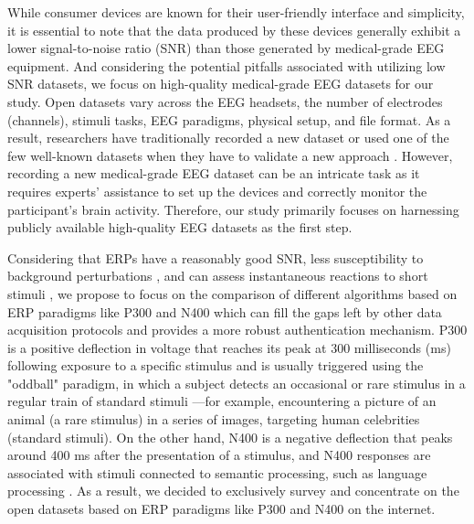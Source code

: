 While consumer devices are known for their user-friendly interface and simplicity, it is essential to note that the data produced by these devices generally exhibit a lower signal-to-noise ratio (SNR) than those generated by medical-grade EEG equipment. And considering the potential pitfalls associated with utilizing low SNR datasets, we focus on high-quality medical-grade EEG datasets for our study. Open datasets vary across the EEG headsets, the number of electrodes (channels), stimuli tasks, EEG paradigms, physical setup, and file format. As a result, researchers have traditionally recorded a new dataset or used one of the few well-known datasets when they have to validate a new approach \cite{moabb}. However, recording a new medical-grade EEG dataset can be an intricate task as it requires experts' assistance to set up the devices and correctly monitor the participant's brain activity. Therefore, our study primarily focuses on harnessing publicly available high-quality EEG datasets as the first step.
\smallskip

Considering that ERPs have a reasonably good SNR, less susceptibility to background perturbations \cite{armstrong2015brainprint}, and can assess instantaneous reactions to short stimuli \cite{zhang2021review}, we propose to focus on the comparison of different algorithms based on ERP paradigms like P300 and N400 which can fill the gaps left by other data acquisition protocols and provides a more robust authentication mechanism. P300 is a positive deflection in voltage that reaches its peak at 300 milliseconds (ms) following exposure to a specific stimulus and is usually triggered using the "oddball" paradigm, in which a subject detects an occasional or rare stimulus in a regular train of standard stimuli \cite{picton1992p300}—for example, encountering a picture of an animal (a rare stimulus) in a series of images, targeting human celebrities (standard stimuli). On the other hand, N400 is a negative deflection that peaks around 400 ms after the presentation of a stimulus, and N400 responses are associated with stimuli connected to semantic processing, such as language processing \cite{arias2021inexpensive}. As a result, we decided to exclusively survey and concentrate on the open datasets based on ERP paradigms like P300 and N400 on the internet.  
\smallskip

